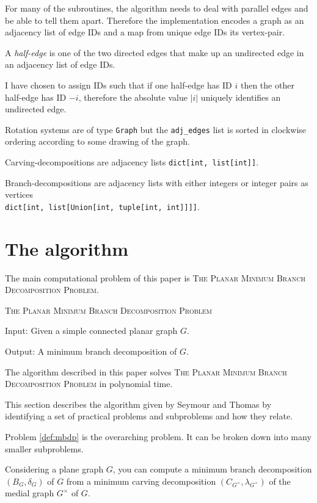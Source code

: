 \documentclass{article}
\begin{document}
	For many of the subroutines, the algorithm needs to deal with parallel edges and be able to tell them apart. Therefore the implementation encodes a graph as an adjacency list of edge IDs and a map from unique edge IDs its vertex-pair.

	A \textit{half-edge} is one of the two directed edges that make up an undirected edge in an adjacency list of edge IDs.
	
	I have chosen to assign IDs such that if one half-edge has ID $i$ then the other half-edge has ID $-i$, therefore the absolute value $|i|$ uniquely identifies an undirected edge.


	Rotation systems are of type \texttt{Graph} but the \texttt{adj_edges} list is sorted in clockwise ordering according to some drawing of the graph.

	Carving-decompositions are adjacency lists \texttt{dict[int, list[int]]}.

	Branch-decompositions are adjacency lists with either integers or integer pairs as vertices\\ \texttt{dict[int, list[Union[int, tuple[int, int]]]]}.

\section{The algorithm}

	The main computational problem of this paper is \textsc{The Planar Minimum Branch Decomposition Problem}.

	\begin{definition}\label{def:mbdp}
		\textsc{The Planar Minimum Branch Decomposition Problem}

		Input: Given a simple connected planar graph $G$.

		Output: A minimum branch decomposition of $G$.
	\end{definition}

	The algorithm described in this paper solves \textsc{The Planar Minimum Branch Decomposition Problem} in polynomial time.

	This section describes the algorithm given by Seymour and Thomas\cite{ST93} by identifying a set of practical problems and subproblems and how they relate.
	
	Problem \ref{def:mbdp} is the overarching problem. It can be broken down into many smaller subproblems.

	Considering a plane graph $G$, you can compute a minimum branch decomposition $(B_G, \delta_G)$ of $G$ from a minimum carving decomposition $(C_{G^\times}, \lambda_{G^\times})$ of the medial graph $G^\times$ of $G$.
\end{document}
